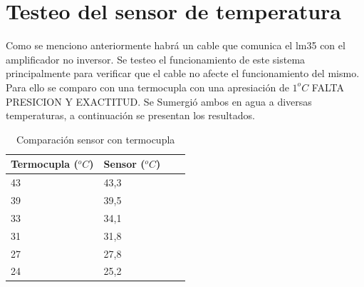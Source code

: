 \section{Testeo del sensor de temperatura}
Como se menciono anteriormente habrá un cable que comunica el lm35 con el amplificador no inversor. Se testeo el funcionamiento de este sistema principalmente para verificar que el cable no afecte el funcionamiento del mismo. Para ello se comparo con una termocupla con una apresiación de $1^{o}C$ FALTA PRESICION Y EXACTITUD. Se Sumergió ambos en agua a diversas temperaturas, a continuación se presentan los resultados.\\



\begin{table}[htp]
\centering
\caption{Comparación sensor con termocupla}
\label{tabla:sensor_temperatura}

\begin{tabular}{|l|l|l|l|}
	\hline
	Termocupla ($^{o}C$) & Sensor ($^{o}C$)  \\ \hline
	43 & 43,3 \\ \hline
    39 & 39,5 \\ \hline
    33 & 34,1 \\ \hline
    31 & 31,8 \\ \hline
    27 & 27,8 \\ \hline
    24 & 25,2 \\ \hline    
\end{tabular}
\end{table}

